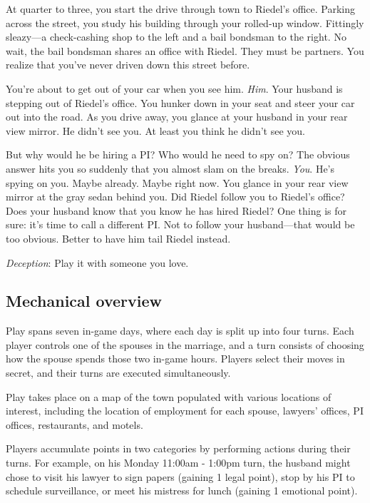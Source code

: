 \documentclass[12pt]{article}
\newcommand{\gtitle}{{\it Deception}}
\begin{document}
At quarter to three, you start the drive through town to Riedel's office.  Parking across the street, you study his building through your rolled-up window.  Fittingly sleazy---a check-cashing shop to the left and a bail bondsman to the right.  No wait, the bail bondsman shares an office with Riedel.  They must be partners.  You realize that you've never driven down this street before.

You're about to get out of your car when you see him.  {\it Him}.  Your husband is stepping out of Riedel's office.  You hunker down in your seat and steer your car out into the road.  As you drive away, you glance at your husband in your rear view mirror.  He didn't see you.  At least you think he didn't see you.

But why would he be hiring a PI?  Who would he need to spy on?  The obvious answer hits you so suddenly that you almost slam on the breaks.  {\it You}.  He's spying on you.  Maybe already.  Maybe right now.  You glance in your rear view mirror at the gray sedan behind you.  Did Riedel follow you to Riedel's office?  Does your husband know that you know he has hired Riedel?  One thing is for sure:  it's time to call a different PI.  Not to follow your husband---that would be too obvious.  Better to have him tail Riedel instead.  

\gtitle: Play it with someone you love.

\subsection{Mechanical overview}

Play spans seven in-game days, where each day is split up into four turns.  Each player controls one of the spouses in the marriage, and a turn consists of choosing how the spouse spends those two in-game hours.  Players select their moves in secret, and their turns are executed simultaneously.

Play takes place on a map of the town populated with various locations of interest, including the location of employment for each spouse, lawyers' offices, PI offices, restaurants, and motels.

Players accumulate points in two categories by performing actions during their turns.  For example, on his Monday 11:00am - 1:00pm turn, the husband might chose to visit his lawyer to sign papers (gaining 1 legal point), stop by his PI to schedule surveillance, or meet his mistress for lunch (gaining 1 emotional point).
\end{document}
